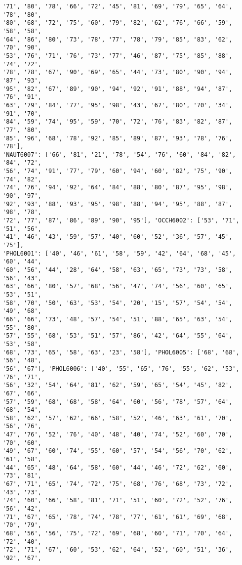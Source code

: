 \documentclass[11pt]{article}
\begin{document}
\begin{Verbatim}[commandchars=\\\{\}]
'71', '80', '78', '66', '72', '45', '81', '69', '79', '65', '64', '78', '80',
'80', '68', '72', '75', '60', '79', '82', '62', '76', '66', '59', '58', '58',
'64', '86', '80', '73', '78', '77', '78', '79', '85', '83', '62', '70', '90',
'53', '76', '71', '76', '73', '77', '46', '87', '75', '85', '88', '74', '72',
'78', '78', '67', '90', '69', '65', '44', '73', '80', '90', '94', '87', '93',
'95', '82', '67', '89', '90', '94', '92', '91', '88', '94', '87', '76', '91',
'63', '79', '84', '77', '95', '98', '43', '67', '80', '70', '34', '91', '70',
'84', '59', '74', '95', '59', '70', '72', '76', '83', '82', '87', '77', '80',
'85', '96', '68', '78', '92', '85', '89', '87', '93', '78', '76', '78'],
'NAUT6007': ['66', '81', '21', '78', '54', '76', '60', '84', '82', '84', '72',
'56', '74', '91', '77', '79', '60', '94', '60', '82', '75', '90', '74', '82',
'74', '76', '94', '92', '64', '84', '88', '80', '87', '95', '98', '90', '97',
'92', '93', '88', '93', '95', '98', '88', '94', '95', '88', '87', '98', '78',
'72', '77', '87', '86', '89', '90', '95'], 'OCCH6002': ['53', '71', '51', '56',
'41', '46', '43', '59', '57', '40', '60', '52', '36', '57', '45', '75'],
'PHOL6001': ['40', '46', '61', '58', '59', '42', '64', '68', '45', '60', '44',
'60', '56', '44', '28', '64', '58', '63', '65', '73', '73', '58', '56', '43',
'63', '66', '80', '57', '68', '56', '47', '74', '56', '60', '65', '53', '51',
'58', '70', '50', '63', '53', '54', '20', '15', '57', '54', '54', '49', '68',
'66', '66', '73', '48', '57', '54', '51', '88', '65', '63', '54', '55', '80',
'57', '55', '68', '53', '51', '57', '86', '42', '64', '55', '64', '53', '58',
'68', '73', '65', '58', '63', '23', '58'], 'PHOL6005': ['68', '68', '56', '48',
'56', '67'], 'PHOL6006': ['40', '55', '65', '76', '55', '62', '53', '76', '71',
'56', '32', '54', '64', '81', '62', '59', '65', '54', '45', '82', '67', '66',
'57', '59', '68', '68', '58', '64', '60', '56', '78', '57', '64', '68', '54',
'58', '62', '57', '62', '66', '58', '52', '46', '63', '61', '70', '56', '76',
'47', '76', '52', '76', '40', '48', '40', '74', '52', '60', '70', '70', '60',
'49', '67', '60', '74', '55', '60', '57', '54', '56', '70', '62', '61', '58',
'44', '65', '48', '64', '58', '60', '44', '46', '72', '62', '60', '73', '81',
'67', '71', '65', '74', '72', '75', '68', '76', '68', '73', '72', '43', '73',
'74', '60', '66', '58', '81', '71', '51', '60', '72', '52', '76', '56', '42',
'71', '67', '65', '78', '74', '78', '77', '61', '61', '69', '68', '70', '79',
'68', '56', '56', '75', '72', '69', '68', '60', '71', '70', '64', '72', '40',
'72', '71', '67', '60', '53', '62', '64', '52', '60', '51', '36', '92', '67',

\end{Verbatim}
\end{document}
